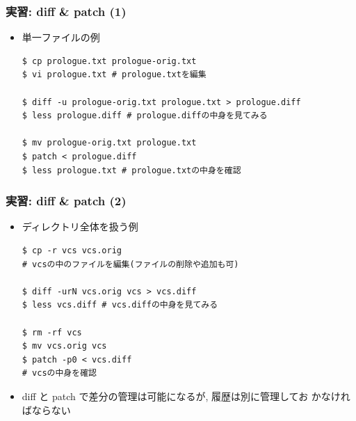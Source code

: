 \begin{frame}[t,fragile]
  \frametitle{実習: diff \& patch (1)}
  \begin{itemize}
  \item 単一ファイルの例
\begin{lstlisting}
$ cp prologue.txt prologue-orig.txt
$ vi prologue.txt # prologue.txtを編集

$ diff -u prologue-orig.txt prologue.txt > prologue.diff
$ less prologue.diff # prologue.diffの中身を見てみる

$ mv prologue-orig.txt prologue.txt
$ patch < prologue.diff
$ less prologue.txt # prologue.txtの中身を確認
\end{lstlisting}
  \end{itemize}
\end{frame}

\begin{frame}[t,fragile]
  \frametitle{実習: diff \& patch (2)}
  \begin{itemize}
  \item ディレクトリ全体を扱う例
\begin{lstlisting}
$ cp -r vcs vcs.orig
# vcsの中のファイルを編集(ファイルの削除や追加も可)

$ diff -urN vcs.orig vcs > vcs.diff
$ less vcs.diff # vcs.diffの中身を見てみる

$ rm -rf vcs
$ mv vcs.orig vcs
$ patch -p0 < vcs.diff
# vcsの中身を確認
\end{lstlisting}
  \item diff と patch で差分の管理は可能になるが, 履歴は別に管理してお
    かなければならない
  \end{itemize}
\end{frame}
